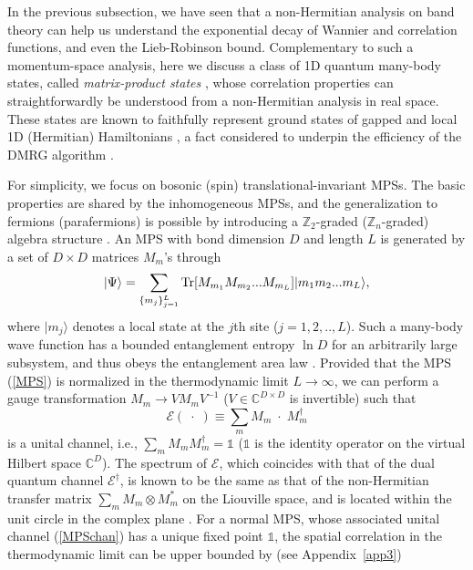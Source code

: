 \documentclass{tADP2e}
\theoremstyle{plain}
\theoremstyle{plain}
\theoremstyle{definition}
\begin{document}
\vspace{3pt}
\noindent
In the previous subsection, we have seen that a non-Hermitian analysis on band theory can help us understand the exponential decay of Wannier and correlation functions, and even the Lieb-Robinson bound. 
Complementary to such a momentum-space analysis, here we discuss a class of 1D quantum many-body states, called \emph{matrix-product states} \cite{MF92,perez07mps,FV08}, whose correlation properties can straightforwardly be understood from a non-Hermitian analysis in real space. These states are known to faithfully represent ground states of gapped and local 1D (Hermitian) Hamiltonians \cite{VF06}, a fact considered to underpin the efficiency of the DMRG algorithm \cite{US11}. 

For simplicity, we focus on bosonic (spin) translational-invariant MPSs. The basic properties are shared by the inhomogeneous MPSs, and the generalization to fermions (parafermions) is possible by introducing a $\mathbb{Z}_2$-graded ($\mathbb{Z}_n$-graded) algebra structure \cite{BN17,XWT17}. An MPS with bond dimension $D$ and length $L$ is generated by a set of $D\times D$ matrices $M_m$'s through
\begin{equation}
|\Psi\rangle=\sum_{\{m_j\}^L_{j=1}}{\rm Tr}[M_{m_1}M_{m_2}...M_{m_L}]|m_1m_2...m_L\rangle,
\label{MPS}
\end{equation}
where $|m_j\rangle$ denotes a local state at the $j$th site ($j=1,2,..,L$). Such a many-body wave function has a bounded entanglement entropy $\ln D$ for an arbitrarily large subsystem, and thus obeys the entanglement area law \cite{EJ10}. Provided that the MPS (\ref{MPS}) is normalized in the thermodynamic limit $L\to\infty$, we can perform a gauge transformation $M_m\to VM_m V^{-1}$ ($V\in\mathbb{C}^{D\times D}$ is invertible) such that 
\begin{equation}
\mathcal{E}(\;\cdot\;)\equiv\sum_m M_m\;\cdot\;M_m^\dag
\label{MPSchan}
\end{equation}
is a {unital channel}, i.e., $\sum_m M_mM_m^\dag =\mathbb{1}$ ($\mathbb{1}$ is the identity operator on the virtual Hilbert space $\mathbb{C}^D$). The spectrum of $\mathcal{E}$, which coincides with that of the dual quantum channel $\mathcal{E}^\dag$, is known to be the same as that of the non-Hermitian {transfer matrix} $\sum_mM_m\otimes M^*_m$ on the Liouville space, and is located within the unit circle in the complex plane \cite{WMM08}. For a {normal} MPS, whose associated unital channel (\ref{MPSchan}) has a {unique} fixed point $\mathbb{1}$, the spatial correlation in the thermodynamic limit can be upper bounded by (see Appendix~\ref{app3})
\end{document}
